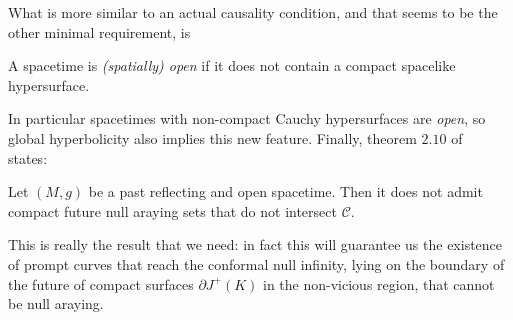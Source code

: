 	What is more similar to an actual causality condition, and that seems to be the other minimal requirement, is
	\begin{definition}
		A spacetime is \emph{(spatially) open} if it does not contain a compact spacelike hypersurface.
	\end{definition}	
	In particular spacetimes with non-compact Cauchy hypersurfaces are \emph{open}, so global hyperbolicity also implies this new feature. 
	Finally, theorem \(2.10\) of~\cite[]{minguzzi2020gravitational} states:
	\begin{theorem}
		Let \((M,g)\) be a past reflecting and open spacetime. Then it does not admit compact future null araying sets that do not intersect \(\mathcal{C}\).
	\end{theorem}
	This is really the result that we need: in fact this will guarantee us the existence of prompt curves that reach the conformal null infinity, lying on the boundary of the future of compact surfaces \(\partial J^+(K)\) in the non-vicious region, that cannot be null araying.